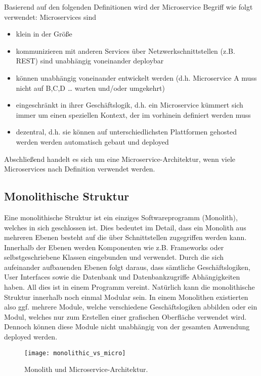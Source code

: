 Basierend auf den folgenden Definitionen wird der Microservice Begriff wie folgt verwendet: Microservices sind
\begin{itemize}
	\item klein in der Größe
	\item kommunizieren mit anderen Services über Netzwerkschnittstellen (z.B. REST) sind unabhängig voneinander deploybar
	\item können unabhängig voneinander entwickelt werden (d.h. Microservice A muss nicht auf B,C,D … warten und/oder umgekehrt)    
	\item eingeschränkt in ihrer Geschäftslogik, d.h. ein Microservice kümmert sich immer um einen speziellen Kontext, der im vorhinein definiert werden muss
	\item dezentral, d.h. sie können auf unterschiedlichsten Plattformen gehosted werden werden automatisch gebaut und deployed
\end{itemize}

Abschließend handelt es sich um eine Microservice-Architektur, wenn viele Microservices nach Definition verwendet werden. 

\subsection{Monolithische Struktur }

Eine monolithische Struktur ist ein einziges Softwareprogramm (Monolith), welches in sich geschlossen ist. Dies bedeutet im Detail, dass ein Monolith aus mehreren Ebenen besteht auf die über Schnittstellen zugegriffen werden kann. Innerhalb der Ebenen werden Komponenten wie z.B. Frameworks oder selbstgeschriebene Klassen eingebunden und verwendet.\cite{msfussell2017azure} Durch die sich aufeinander aufbauenden Ebenen folgt daraus, dass sämtliche Geschäftslogiken, User Interfaces sowie die Datenbank und Datenbankzugriffe Abhängigkeiten haben. All dies ist in einem Programm vereint.\cite{msfussell2017azure} Natürlich kann die monolithische Struktur innerhalb noch einmal Modular sein. In einem Monolithen existierten also ggf. mehrere Module, welche verschiedene Geschäftslogiken abbilden oder ein Modul, welches nur zum Erstellen einer grafischen Oberfläche verwendet wird. Dennoch können diese Module nicht unabhängig von der gesamten Anwendung deployed werden.\cite{nhiem2017mic_moving}

\begin{figure}[ht]
	\centering
	\texttt{[image: monolithic\_vs\_micro]}
	\caption[Monolith und Microservice-Architektur] {Monolith und Microservice-Architektur.\cite{msfussell2017azure}}
	\label{fig:mono}
\end{figure}

